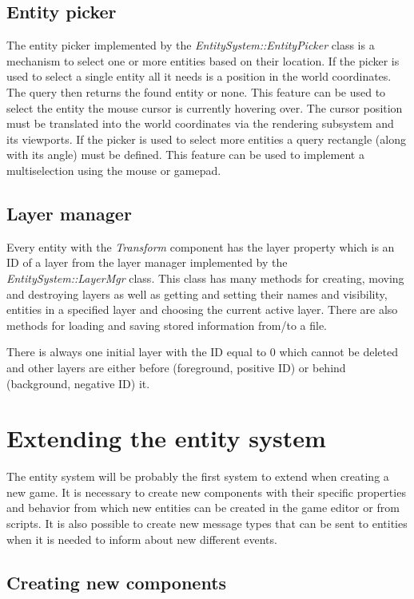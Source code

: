 \subsection{Entity picker}

The entity picker implemented by the \emph{EntitySystem::EntityPicker} class is a mechanism to select one or more entities based on their location. If the picker is used to select a single entity all it needs is a position in the world coordinates. The query then returns the found entity or none. This feature can be used to select the entity the mouse cursor is currently hovering over. The cursor position must be translated into the world coordinates via the rendering subsystem and its viewports. If the picker is used to select more entities a query rectangle (along with its angle) must be defined. This feature can be used to implement a multiselection using the mouse or gamepad.

\subsection{Layer manager}

Every entity with the \emph{Transform} component has the layer property which is an ID of a layer from the layer manager implemented by the \emph{EntitySystem::LayerMgr} class. This class has many methods for creating, moving and destroying layers as well as getting and setting their names and visibility, entities in a specified layer and choosing the current active layer. There are also methods for loading and saving stored information from/to a file.

There is always one initial layer with the ID equal to 0 which cannot be deleted and other layers are either before (foreground, positive ID) or behind (background, negative ID) it.


\section{Extending the entity system}
\label{sec:entity-extending}

The entity system will be probably the first system to extend when creating a new game. It is necessary to create new components with their specific properties and behavior from which new entities can be created in the game editor or from scripts. It is also possible to create new message types that can be sent to entities when it is needed to inform about new different events.

\subsection{Creating new components}
\label{sub:entity-newcomponents}

